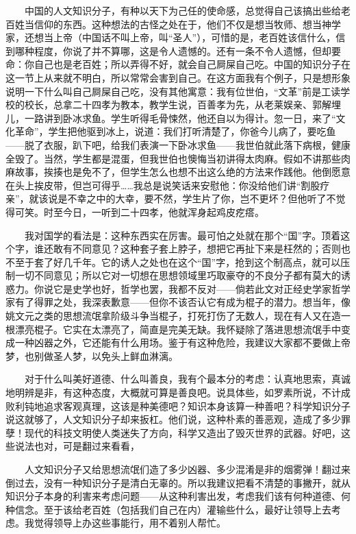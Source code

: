 　　中国的人文知识分子，有种以天下为己任的使命感，总觉得自己该搞出些给老百姓当信仰的东西。这种想法的古怪之处在于，他们不仅是想当牧师、想当神学家，还想当上帝（中国话不叫上帝，叫“圣人”），可惜的是，老百姓该信什么，信到哪种程度，你说了并不算哪，这是令人遗憾的。还有一条不令人遗憾，但却要命：你自己也是老百姓；所以弄得不好，就会自己屙屎自己吃。中国的知识分子在这一节上从来就不明白，所以常常会害到自己。在这方面我有个例子，只是想形象说明一下什么叫自己屙屎自己吃，没有其他寓意：我有位世伯，“文革”前是工读学校的校长，总拿二十四孝为教本，教学生说，百善孝为先，从老莱娱亲、郭解埋儿，一路讲到卧冰求鱼。学生听得毛骨悚然，他还自以为得计。忽一日，来了“文化革命”，学生把他驱到冰上，说道：我们打听清楚了，你爸今儿病了，要吃鱼 ——脱了衣服，趴下吧，给我们表演一下卧冰求鱼——我世伯就此落下病根，健康全毁了。当然，学生都是混蛋，但我世伯也懊悔当初讲得太肉麻。假如不讲那些肉麻故事，挨揍也是免不了，但学生怎么也想不出这么绝的方法来作践他。他倒愿意在头上挨皮带，但岂可得乎……我总是说笑话来安慰他：你没给他们讲“割股疗亲”，就该说是不幸之中的大幸，要不然，学生片了你，岂不更坏？但他听了不觉得可笑。时至今日，一听到二十四孝，他就浑身起鸡皮疙瘩。 

　　我对国学的看法是：这种东西实在厉害。最可怕之处就在那个“国”字。顶着这个字，谁还敢有不同意见？这种套子套上脖子，想把它再扯下来是枉然的；否则也不至于套了好几千年。它的诱人之处也在这个“国”字，抢到这个制高点，就可以压制一切不同意见；所以它对一切想在思想领域里巧取豪夺的不良分子都有莫大的诱惑力。你说它是史学也好，哲学也罢，我都不反对——倘若此文对正经史学家哲学家有了得罪之处，我深表歉意——但你不该否认它有成为棍子的潜力。想当年，像姚文元之类的思想流氓拿阶级斗争当棍子，打死打伤了无数人，现在有人又在造一根漂亮棍子。它实在太漂亮了，简直是完美无缺。我怀疑除了落进思想流氓手中变成一种凶器之外，它还能有什么用场。鉴于有这种危险，我建议大家都不要做上帝梦，也别做圣人梦，以免头上鲜血淋漓。 

　　对于什么叫美好道德、什么叫善良，我有个最本分的考虑：认真地思索，真诚地明辨是非，有这种态度，大概就可算是善良吧。说具体些，如罗素所说，不计成败利钝地追求客观真理，这该是种美德吧？知识本身该算一种善吧？科学知识分子说这就够了，人文知识分子却来扳杠。他们说，这种朴素的善恶观，造成了多少罪孽！现代的科技文明使人类迷失了方向，科学又造出了毁灭世界的武器。好吧，这些说法也对，可是翻过来看看， 

　　人文知识分子又给思想流氓们造了多少凶器、多少混淆是非的烟雾弹！翻过来倒过去，没有一种知识分子是清白无辜的。所以我建议把看不清楚的事撇开，就从知识分子本身的利害来考虑问题——从这种利害出发，考虑我们该有何种道德、何种信念。至于该给老百姓（包括我们自己在内）灌输些什么，最好让领导上去考虑。我觉得领导上办这些事能行，用不着别人帮忙。 

